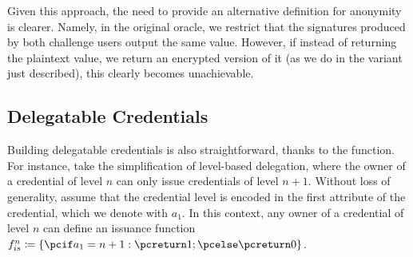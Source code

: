 Given this approach, the need to provide an alternative definition for anonymity
is clearer. Namely, in the original \CHALb oracle, we restrict that the
signatures produced by both challenge users output the same \yeval value.
However, if instead of returning the plaintext \yeval value, we return an
encrypted version of it (as we do in the variant just described), this clearly
becomes unachievable.


\subsection{Delegatable Credentials}

Building delegatable credentials is also straightforward, thanks to the \fissue
function. For instance, take the simplification of level-based delegation, where
the owner of a credential of level $n$ can only issue credentials of level
$n+1$. Without loss of generality, assume that the credential level is encoded
in the first attribute of the credential, which we denote with $a_1$. In this
context, any owner of a credential of level $n$ can define an issuance function
$\fissue^n \coloneqq \lbrace \pcif a_1 = n+1: \pcreturn 1; \pcelse \pcreturn 0
\rbrace$.


